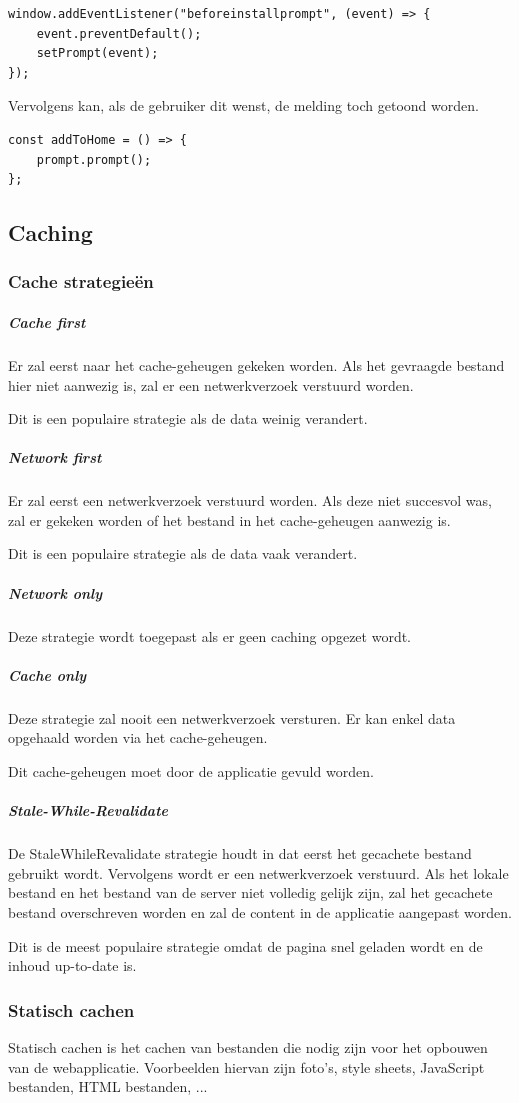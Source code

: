 \newpage
\begin{lstlisting}
window.addEventListener("beforeinstallprompt", (event) => {
	event.preventDefault();
	setPrompt(event);
}); 
\end{lstlisting}

		Vervolgens kan, als de gebruiker dit wenst, de melding toch getoond worden.
		
\begin{lstlisting}
const addToHome = () => {
	prompt.prompt();
};
\end{lstlisting}
	\subsection{Caching}
	
		\subsubsection{Cache strategieën}
		
			\subparagraph{Cache first}
				Er zal eerst naar het cache-geheugen gekeken worden. Als het gevraagde bestand hier niet aanwezig is, zal er een netwerkverzoek verstuurd worden.
				
				Dit is een populaire strategie als de data weinig verandert. 
			\subparagraph{Network first}
				Er zal eerst een netwerkverzoek verstuurd worden. Als deze niet succesvol was, zal er gekeken worden of het bestand in het cache-geheugen aanwezig is. 
				
				Dit is een populaire strategie als de data vaak verandert.
			\subparagraph{Network only}
				Deze strategie wordt toegepast als er geen caching opgezet wordt. 
			\subparagraph{Cache only}
				Deze strategie zal nooit een netwerkverzoek versturen. Er kan enkel data opgehaald worden via het cache-geheugen.
				
				Dit cache-geheugen moet door de applicatie gevuld worden.
			\subparagraph{Stale-While-Revalidate}
				De StaleWhileRevalidate strategie houdt in dat eerst het \mbox{gecachete} bestand gebruikt wordt. Vervolgens wordt er een netwerkverzoek verstuurd. Als het \mbox{lokale} bestand en het bestand van de server niet volledig gelijk zijn, zal het gecachete bestand overschreven worden en zal de content  in de applicatie aangepast worden.
				
				Dit is de meest populaire strategie omdat de pagina snel geladen wordt en de inhoud up-to-date is.

		\subsubsection{Statisch cachen}
			Statisch cachen is het cachen van bestanden die nodig zijn voor het opbouwen van de webapplicatie. Voorbeelden hiervan zijn foto's, style sheets, JavaScript bestanden, HTML bestanden, ...
			

